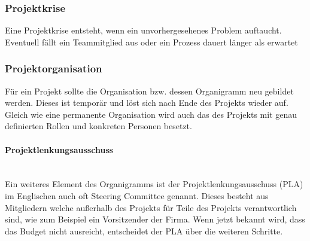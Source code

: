 \documentclass{article}
\newcommand{\paragraphlb}[1]{\paragraph{#1}\mbox{}\\}
\begin{document}
	\subsubsection{Projektkrise}
	Eine Projektkrise entsteht, wenn ein unvorhergesehenes Problem auftaucht. Eventuell fällt ein Teammitglied aus oder ein Prozess dauert länger als erwartet
	\subsubsection{Projektorganisation}
	Für ein Projekt sollte die Organisation bzw. dessen Organigramm neu gebildet werden. Dieses ist temporär und löst sich nach Ende des Projekts wieder auf. Gleich wie eine permanente Organisation wird auch das des Projekts mit genau definierten Rollen und konkreten Personen besetzt.
	\paragraphlb{Projektlenkungsausschuss}
	Ein weiteres Element des Organigramms ist der Projektlenkungsausschuss (PLA) im Englischen auch oft Steering Committee genannt. Dieses besteht aus Mitgliedern welche außerhalb des Projekts für Teile des Projekts verantwortlich sind, wie zum Beispiel ein Vorsitzender der Firma. Wenn jetzt bekannt wird, dass das Budget nicht ausreicht, entscheidet der PLA über die weiteren Schritte.
\end{document}
